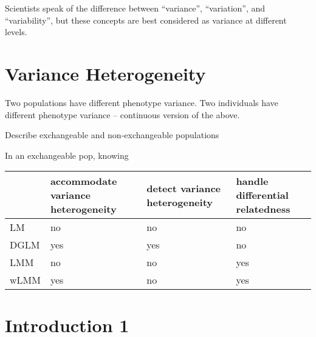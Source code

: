 Scientists speak of the difference between ``variance'', ``variation'', and ``variability'', but these concepts are best considered as variance at different levels.

\section{Variance Heterogeneity}

Two populations have different phenotype variance.
Two individuals have different phenotype variance -- continuous version of the above.

Describe exchangeable and non-exchangeable populations

In an exchangeable pop, knowing 

\begin{table}[ht]
	\begin{tabular}{lp{1in}p{1in}p{1in}}
		\toprule
				& accommodate variance heterogeneity & detect variance heterogeneity & handle differential relatedness\\
		\midrule
		LM 		& no	& no	& no\\
		DGLM 	& yes 	& yes 	& no\\
		LMM  	& no 	& no	& yes\\
		wLMM	& yes	& no	& yes\\
		\bottomrule
	\end{tabular}
\end{table}

\section{Introduction 1}


